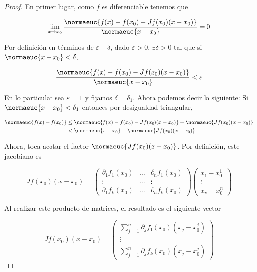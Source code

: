 \begin{proof}
    En primer lugar, como $f$ es diferenciable tenemos que
    
    \[
    \lim_{x \to x_0} \frac{\normaeuc{f(x) - f(x_0) - Jf(x_0)(x - x_0)}}{\normaeuc{x - x_0}} = 0
    \]
    
    Por definición en términos de $\varepsilon - \delta$, dado $\varepsilon > 0$, $\exists \delta > 0$ tal que si $\normaeuc{x-x_0} < \delta$,
    
    \[
    \frac{\normaeuc{f(x) - f(x_0) - Jf(x_0)(x - x_0)}}{\normaeuc{x - x_0}} < \varepsilon
    \]
    
    En lo particular sea $\varepsilon = 1$ y fijamos $\delta = \delta_1$. Ahora podemos decir lo siguiente: Si $\normaeuc{x - x_0} < \delta_1$ entonces por desigualdad triangular,
    
    \begin{align*}
        \normaeuc{f(x) - f(x_0)} &\leq \normaeuc{f(x) - f(x_0) - Jf(x_0)(x-x_0)} + \normaeuc{Jf(x_0)(x-x_0)}\\
            & < \normaeuc{x - x_0} + \normaeuc{Jf(x_0)(x-x_0)}
    \end{align*}
    
    Ahora, toca acotar el factor $\normaeuc{Jf(x_0)(x-x_0)}$. Por definición, este jacobiano es
    
    \[
    Jf(x_0)(x-x_0) =
    \begin{pmatrix}
        \partial_1 f_1 (x_0) & \dots & \partial_n f_1 (x_0) \\
        \vdots             & \dots & \vdots             \\
        \partial_1 f_k (x_0) & \dots & \partial_n f_k (x_0)
    \end{pmatrix}
    \begin{pmatrix}
        x_1-x_0^1 \\
        \vdots    \\
        x_n-x_0^n
    \end{pmatrix}
    \]
    
    Al realizar este producto de matrices, el resultado es el siguiente vector
    
    \[
    Jf(x_0)(x-x_0) =
    \begin{pmatrix}
        \sum_{j=1}^n \partial_j f_1 (x_0) (x_j - x_0^j) \\
        \vdots \\
        \sum_{j=1}^n \partial_j f_k (x_0) (x_j - x_0^j)
    \end{pmatrix}
    \]
    

\end{proof}
